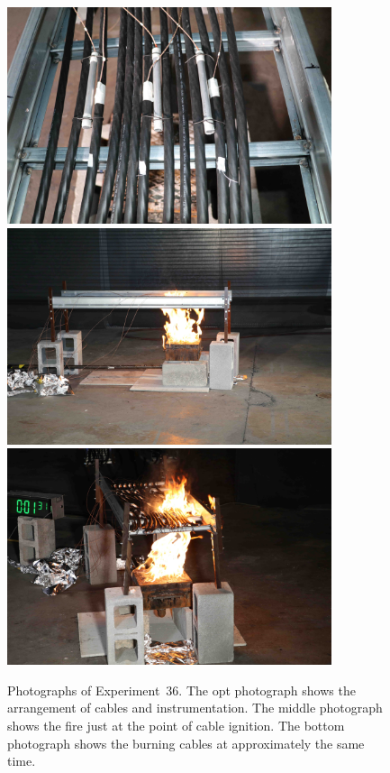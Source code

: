 \begin{figure}[p]
\centering
\includegraphics[height=2.50in]{../FIGURES/Test_36_setup} \\ \vspace{0.1in}
\includegraphics[height=2.50in]{../FIGURES/Test_36_side} \\ \vspace{0.1in}
\includegraphics[height=2.50in]{../FIGURES/Test_36_1_min_31_s}
\caption[Photographs of Experiment~36]{Photographs of Experiment~36. The opt photograph shows the arrangement of cables and instrumentation. The middle photograph shows the fire just at the point of cable ignition. The bottom photograph shows the burning cables at approximately the same time.}
\label{fig:Test_36_photos}
\end{figure}


